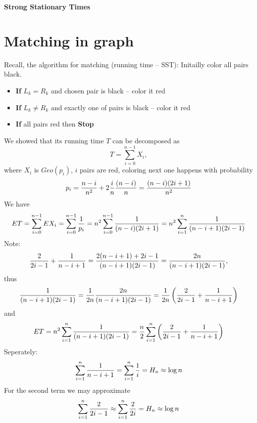 \documentclass[a4paper,12pt]{article}
\begin{document}
 
\noindent
 {
\setlength\fboxsep{4pt}%
 \setlength\fboxrule{2pt}%
 }
\bigskip\bigskip
  \begin{center}
   \textbf{Strong Stationary Times}
  \end{center}
  
  \section{Matching in graph}
  Recall, the algorithm for matching (running time -- SST): Initailly color all pairs black.
  \begin{itemize}
   \item \textbf{If} $L_k=R_k$ and chosen pair is black -- color it red
   \item \textbf{If} $L_k\neq R_k$ and exactly one of pairs is black -- color it red
   \item \textbf{If} all pairs red then \textbf{Stop}
  \end{itemize}
We showed that its running time $T$ can be decomposed as
$$T=\sum_{i=0}^{n-1} X_i,$$
where $X_i$ is $Geo(p_i)$, $i$ pairs are red, coloring next one happens with probability
$$p_i={n-i \over n^2}+2{i\over n}{(n-i)\over n}={(n-i)(2i+1)\over n^2}$$
We have
$$ET=\sum_{i=0}^{n-1} EX_i =\sum_{i=0}^{n-1} {1\over p_i} = n^2 \sum_{i=0}^{n-1} {1\over (n-i)(2i+1)}
=n^2 \sum_{i=1}^{n} {1\over (n-i+1)(2i-1)}$$
Note:
$$
{2\over 2i-1} + {1\over n-i+1} = {2(n-i+1)+2i-1\over (n-i+1)(2i-1)}={2n\over (n-i+1)(2i-1)},
$$
thus
$${1\over (n-i+1)(2i-1)}={1\over 2n} {2n\over (n-i+1)(2i-1)}={1\over 2n} \left({2\over 2i-1} + {1\over n-i+1}\right)$$
and
$$ET=n^2 \sum_{i=1}^{n} {1\over (n-i+1)(2i-1)}={n\over 2} \sum_{i=1}^{n} \left({2\over 2i-1} + {1\over n-i+1}\right)
$$
Seperately:
$$\sum_{i=1}^{n}  {1\over n-i+1}=\sum_{i=1}^n {1\over i} = H_n \approx \log n$$
For the second term we may approximate
$$\sum_{i=1}^{n} {2\over 2i-1}\approx \sum_{i=1}^{n} {2\over 2i} =    H_n \approx \log n$$
\end{document}
